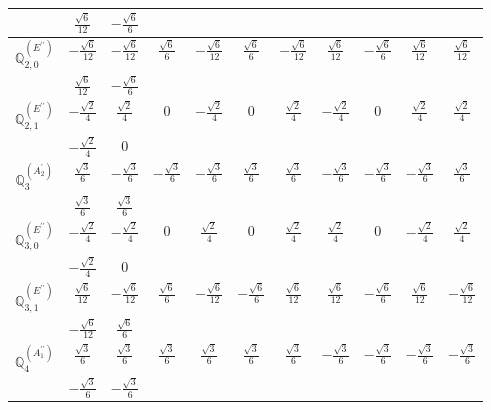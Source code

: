 \documentclass[fleqn,10pt,landscape]{article}
\begin{document}
\begin{itemize}
{\begin{center}
\begin{longtable}{ccccccccccc}
& $ \frac{\sqrt{6}}{12} $ & $ - \frac{\sqrt{6}}{6} $ & $  $ & $  $ & $  $ & $  $ & $  $ & $  $ & $  $ & $  $ \\ \hline
$\mathbb{Q}_{2,0}^{(E^{\prime\prime})}$ & $ - \frac{\sqrt{6}}{12} $ & $ - \frac{\sqrt{6}}{12} $ & $ \frac{\sqrt{6}}{6} $ & $ - \frac{\sqrt{6}}{12} $ & $ \frac{\sqrt{6}}{6} $ & $ - \frac{\sqrt{6}}{12} $ & $ \frac{\sqrt{6}}{12} $ & $ - \frac{\sqrt{6}}{6} $ & $ \frac{\sqrt{6}}{12} $ & $ \frac{\sqrt{6}}{12} $ \\
& $ \frac{\sqrt{6}}{12} $ & $ - \frac{\sqrt{6}}{6} $ & $  $ & $  $ & $  $ & $  $ & $  $ & $  $ & $  $ & $  $ \\ \hline
$\mathbb{Q}_{2,1}^{(E^{\prime\prime})}$ & $ - \frac{\sqrt{2}}{4} $ & $ \frac{\sqrt{2}}{4} $ & $ 0 $ & $ - \frac{\sqrt{2}}{4} $ & $ 0 $ & $ \frac{\sqrt{2}}{4} $ & $ - \frac{\sqrt{2}}{4} $ & $ 0 $ & $ \frac{\sqrt{2}}{4} $ & $ \frac{\sqrt{2}}{4} $ \\
& $ - \frac{\sqrt{2}}{4} $ & $ 0 $ & $  $ & $  $ & $  $ & $  $ & $  $ & $  $ & $  $ & $  $ \\ \hline
$\mathbb{Q}_{3}^{(A_{2}^{\prime})}$ & $ \frac{\sqrt{3}}{6} $ & $ - \frac{\sqrt{3}}{6} $ & $ - \frac{\sqrt{3}}{6} $ & $ - \frac{\sqrt{3}}{6} $ & $ \frac{\sqrt{3}}{6} $ & $ \frac{\sqrt{3}}{6} $ & $ - \frac{\sqrt{3}}{6} $ & $ - \frac{\sqrt{3}}{6} $ & $ - \frac{\sqrt{3}}{6} $ & $ \frac{\sqrt{3}}{6} $ \\
& $ \frac{\sqrt{3}}{6} $ & $ \frac{\sqrt{3}}{6} $ & $  $ & $  $ & $  $ & $  $ & $  $ & $  $ & $  $ & $  $ \\ \hline
$\mathbb{Q}_{3,0}^{(E^{\prime\prime})}$ & $ - \frac{\sqrt{2}}{4} $ & $ - \frac{\sqrt{2}}{4} $ & $ 0 $ & $ \frac{\sqrt{2}}{4} $ & $ 0 $ & $ \frac{\sqrt{2}}{4} $ & $ \frac{\sqrt{2}}{4} $ & $ 0 $ & $ - \frac{\sqrt{2}}{4} $ & $ \frac{\sqrt{2}}{4} $ \\
& $ - \frac{\sqrt{2}}{4} $ & $ 0 $ & $  $ & $  $ & $  $ & $  $ & $  $ & $  $ & $  $ & $  $ \\ \hline
$\mathbb{Q}_{3,1}^{(E^{\prime\prime})}$ & $ \frac{\sqrt{6}}{12} $ & $ - \frac{\sqrt{6}}{12} $ & $ \frac{\sqrt{6}}{6} $ & $ - \frac{\sqrt{6}}{12} $ & $ - \frac{\sqrt{6}}{6} $ & $ \frac{\sqrt{6}}{12} $ & $ \frac{\sqrt{6}}{12} $ & $ - \frac{\sqrt{6}}{6} $ & $ \frac{\sqrt{6}}{12} $ & $ - \frac{\sqrt{6}}{12} $ \\
& $ - \frac{\sqrt{6}}{12} $ & $ \frac{\sqrt{6}}{6} $ & $  $ & $  $ & $  $ & $  $ & $  $ & $  $ & $  $ & $  $ \\ \hline
$\mathbb{Q}_{4}^{(A_{1}^{\prime\prime})}$ & $ \frac{\sqrt{3}}{6} $ & $ \frac{\sqrt{3}}{6} $ & $ \frac{\sqrt{3}}{6} $ & $ \frac{\sqrt{3}}{6} $ & $ \frac{\sqrt{3}}{6} $ & $ \frac{\sqrt{3}}{6} $ & $ - \frac{\sqrt{3}}{6} $ & $ - \frac{\sqrt{3}}{6} $ & $ - \frac{\sqrt{3}}{6} $ & $ - \frac{\sqrt{3}}{6} $ \\
& $ - \frac{\sqrt{3}}{6} $ & $ - \frac{\sqrt{3}}{6} $ & $  $ & $  $ & $  $ & $  $ & $  $ & $  $ & $  $ & $  $ \\
\end{longtable}
\end{center}
}
\end{itemize}
\end{document}
